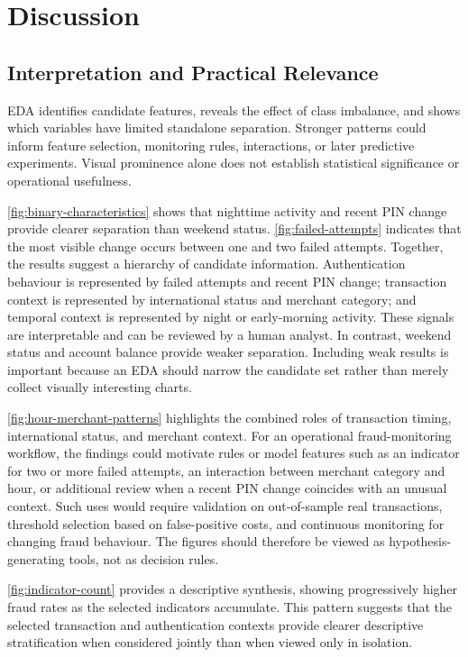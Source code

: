 \documentclass[conference,final,]{IEEEtran}
\begin{document}
\section{Discussion}\label{discussion}

\subsection{Interpretation and Practical
Relevance}\label{interpretation-and-practical-relevance}

EDA identifies candidate features, reveals the effect of class
imbalance, and shows which variables have limited standalone separation.
Stronger patterns could inform feature selection, monitoring rules,
interactions, or later predictive experiments. Visual prominence alone
does not establish statistical significance or operational usefulness.

\autoref{fig:binary-characteristics} shows that nighttime activity and
recent PIN change provide clearer separation than weekend status.
\autoref{fig:failed-attempts} indicates that the most visible change
occurs between one and two failed attempts. Together, the results
suggest a hierarchy of candidate information. Authentication behaviour
is represented by failed attempts and recent PIN change; transaction
context is represented by international status and merchant category;
and temporal context is represented by night or early-morning activity.
These signals are interpretable and can be reviewed by a human analyst.
In contrast, weekend status and account balance provide weaker
separation. Including weak results is important because an EDA should
narrow the candidate set rather than merely collect visually interesting
charts.

\autoref{fig:hour-merchant-patterns} highlights the combined roles of
transaction timing, international status, and merchant context. For an
operational fraud-monitoring workflow, the findings could motivate rules
or model features such as an indicator for two or more failed attempts,
an interaction between merchant category and hour, or additional review
when a recent PIN change coincides with an unusual context. Such uses
would require validation on out-of-sample real transactions, threshold
selection based on false-positive costs, and continuous monitoring for
changing fraud behaviour. The figures should therefore be viewed as
hypothesis-generating tools, not as decision rules.

\autoref{fig:indicator-count} provides a descriptive synthesis, showing
progressively higher fraud rates as the selected indicators accumulate.
This pattern suggests that the selected transaction and authentication
contexts provide clearer descriptive stratification when considered
jointly than when viewed only in isolation.
\end{document}
